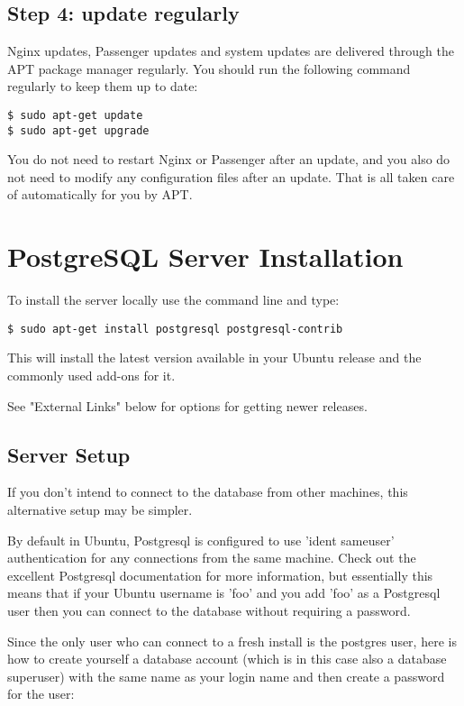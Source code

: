 \documentclass[11pt]{article}
\begin{document}
\subsection{Step 4: update regularly}
\label{sec:org4b0aed2}

Nginx updates, Passenger updates and system updates are delivered through the APT package manager regularly. You should run the following command regularly to keep them up to date:

\begin{verbatim}
$ sudo apt-get update
$ sudo apt-get upgrade
\end{verbatim}

You do not need to restart Nginx or Passenger after an update, and you also do not need to modify any configuration files after an update. That is all taken care of automatically for you by APT.

\section{PostgreSQL Server Installation}
\label{sec:org63ba3dd}

To install the server locally use the command line and type:

\begin{verbatim}
$ sudo apt-get install postgresql postgresql-contrib
\end{verbatim}

This will install the latest version available in your Ubuntu release and the commonly used add-ons for it.

See "External Links" below for options for getting newer releases.

\subsection{Server Setup}
\label{sec:orge779024}

If you don't intend to connect to the database from other machines, this alternative setup may be simpler.

By default in Ubuntu, Postgresql is configured to use 'ident sameuser' authentication for any connections from the same machine. Check out the excellent Postgresql documentation for more information, but essentially this means that if your Ubuntu username is 'foo' and you add 'foo' as a Postgresql user then you can connect to the database without requiring a password.

Since the only user who can connect to a fresh install is the postgres user, here is how to create yourself a database account (which is in this case also a database superuser) with the same name as your login name and then create a password for the user:
\end{document}
